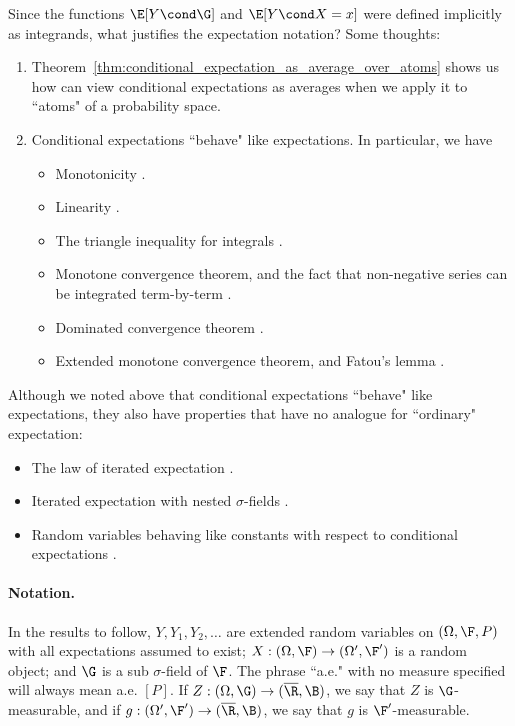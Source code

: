 \documentclass{article} %
\begin{document}
Since the functions $\E[Y \cond \G]$ and $\E[Y \cond X = x]$ were defined implicitly as integrands, what justifies the expectation notation?  Some thoughts:

\begin{enumerate}
\item 
Theorem~\ref{thm:conditional_expectation_as_average_over_atoms} shows us how can view conditional expectations as averages when we apply it to ``atoms" of a probability space. 	
\item Conditional expectations ``behave" like expectations.  In particular, we have
\begin{itemize}
\item Monotonicity \cite[Thm. 5.5.1b]{ash2000probability}.
\item Linearity \cite[Thm. 5.5.2]{ash2000probability}.	
\item The triangle inequality for integrals \cite[Thm. 5.5.1c]{ash2000probability}.
\item Monotone convergence theorem, and the fact that non-negative series can be integrated term-by-term  \cite[Thm. 5.5.3]{ash2000probability}.
\item Dominated convergence theorem \cite[Thm. 5.5.5]{ash2000probability}.
\item Extended monotone convergence theorem, and Fatou's lemma \cite[Thm. 5.5.6]{ash2000probability}.
\end{itemize}
\end{enumerate}



Although we noted above that conditional expectations ``behave" like expectations, they also have properties that have no analogue for ``ordinary" expectation:

\begin{itemize}
\item The law of iterated expectation \cite[Thm. 5.5.4]{ash2000probability}.	
\item Iterated expectation with nested $\sigma$-fields \cite[Thm. 5.5.10]{ash2000probability}.
\item Random variables behaving like constants with respect to conditional expectations  \cite[Thm. 5.5.11]{ash2000probability}.
\end{itemize}

\paragraph{Notation.} In the results to follow, $Y, Y_1, Y_2, \hdots$ are extended random variables on $(\Omega, \F,P)$ with all expectations assumed to exist; $X: (\Omega, \F) \to (\Omega', \F')$ is a random object; and $\G$ is a sub $\sigma$-field of $\F$. The phrase ``a.e." with no measure specified will always mean a.e. $[P]$.  If $Z:(\Omega, \G) \to (\overline{\R}, \B)$, we say that $Z$ is $\G$-measurable, and if $g:(\Omega', \F') \to (\overline{\R}, \B)$, we say that $g$ is $\F'$-measurable.
\end{document}
